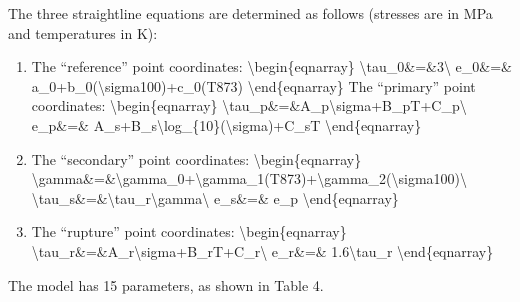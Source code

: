 \documentclass[letterpaper,10pt,english]{jupyterBook}
\begin{document}
	\sphinxAtStartPar
	The three straight\sphinxhyphen{}line equations are determined as follows (stresses are in MPa and temperatures in K):
	\begin{enumerate}
		\item {} 
		\sphinxAtStartPar
		The “reference” point coordinates:
		\textbackslash{}begin\{eqnarray\}
		\textbackslash{}tau\_0\&=\&\sphinxhyphen{}3\textbackslash{}
		e\_0\&=\& a\_0+b\_0(\textbackslash{}sigma\sphinxhyphen{}100)+c\_0(T\sphinxhyphen{}873)
		\textbackslash{}end\{eqnarray\}
		The “primary” point coordinates:
		\textbackslash{}begin\{eqnarray\}
		\textbackslash{}tau\_p\&=\&A\_p\textbackslash{}sigma+B\_pT+C\_p\textbackslash{}
		e\_p\&=\& A\_s+B\_s\textbackslash{}log\_\{10\}(\textbackslash{}sigma)+C\_sT
		\textbackslash{}end\{eqnarray\}
		
		\item {} 
		\sphinxAtStartPar
		The “secondary” point coordinates:
		\textbackslash{}begin\{eqnarray\}
		\textbackslash{}gamma\&=\&\textbackslash{}gamma\_0+\textbackslash{}gamma\_1(T\sphinxhyphen{}873)+\textbackslash{}gamma\_2(\textbackslash{}sigma\sphinxhyphen{}100)\textbackslash{}
		\textbackslash{}tau\_s\&=\&\textbackslash{}tau\_r\textbackslash{}gamma\textbackslash{}
		e\_s\&=\& e\_p
		\textbackslash{}end\{eqnarray\}
		
		\item {} 
		\sphinxAtStartPar
		The “rupture” point coordinates:
		\textbackslash{}begin\{eqnarray\}
		\textbackslash{}tau\_r\&=\&A\_r\textbackslash{}sigma+B\_rT+C\_r\textbackslash{}
		e\_r\&=\& \sphinxhyphen{}1.6\textbackslash{}tau\_r
		\textbackslash{}end\{eqnarray\}
		
	\end{enumerate}
	
	\sphinxAtStartPar
	The model has 15 parameters, as shown in Table 4.
	
\end{document}
